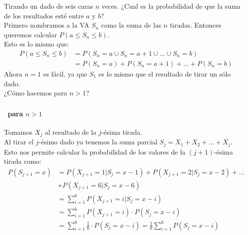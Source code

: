 \documentclass{beamer}
\begin{document}
\begin{frame}
  \frametitle{\SECTIONB}
  \framesubtitle{\EJA}

  Tirando un dado de seis caras \(n\) veces. ¿Cual es la probabilidad de que la suma de los resultados esté entre \(a\) y \(b\)? \pause \\
  Primero nombramos a la VA \(S_{n}\) como la suma de las \(n\) tiradas. Entonces queremos calcular \(P(a \leq S_{n} \leq b)\). \pause \\
  Esto es lo mismo que:
  \begin{align*}
    P(a \leq S_{n} \leq b) &= P(S_{n} = a \cup S_{n} = a+1 \cup \ldots \cup S_{n} = b) \\
                           &= P(S_{n} = a) + P(S_{n} = a+1) + \ldots + P(S_{n} = b)
  \end{align*} \pause
  Ahora \(n = 1\) es fácil, ya que \(S_{1}\) es lo mismo que el resultado de tirar un sólo dado. \\
  ¿Cómo hacemos para \(n > 1\)?

\end{frame}

\begin{frame}
  \frametitle{\SECTIONB}
  \framesubtitle{\EJA\ para \(n > 1\)}

  Tomamos \(X_{j}\) al resultado de la \(j\)-ésima tirada. \\
  Al tirar el \(j\)-ésimo dado ya tenemos la suma parcial \(S_{j} = X_{1} + X_{2} + \ldots + X_{j}\). \pause \\
  Esto nos permite calcular la probabilidad de los valores de la \((j+1)\)-ésima tirada como:
  {\small
  \begin{align*}
    P(S_{j+1} = x) &= P(X_{j+1} = 1 | S_{j} = x - 1) + P(X_{j+1} = 2 | S_{j} = x - 2) + \ldots \\
                  & + P(X_{j+1} = 6 | S_{j} = x - 6)  \\
                  &= \sum_{i = 1}^{6}P(X_{j+1} = i | S_{j} = x - i) \\
                  &= \sum_{i = 1}^{6}P(X_{j+1} = i) \cdot P(S_{j} = x - i) \\
                  &= \sum_{i = 1}^{6}\frac{1}{6} \cdot P(S_{j} = x - i) = \frac{1}{6}\sum_{i = 1}^{6}P(S_{j} = x - i) \\
  \end{align*}
  }%
\end{frame}
\end{document}
